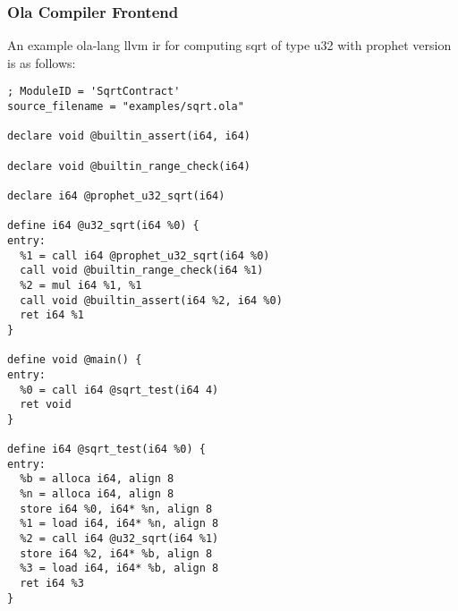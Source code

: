 \subsubsection{Ola Compiler Frontend}

An example ola-lang llvm ir for computing sqrt of type u32 with prophet version is as follows:
\begin{lstlisting}[language={}]
; ModuleID = 'SqrtContract'
source_filename = "examples/sqrt.ola"

declare void @builtin_assert(i64, i64)

declare void @builtin_range_check(i64)

declare i64 @prophet_u32_sqrt(i64)

define i64 @u32_sqrt(i64 %0) {
entry:
  %1 = call i64 @prophet_u32_sqrt(i64 %0)
  call void @builtin_range_check(i64 %1)
  %2 = mul i64 %1, %1
  call void @builtin_assert(i64 %2, i64 %0)
  ret i64 %1
}

define void @main() {
entry:
  %0 = call i64 @sqrt_test(i64 4)
  ret void
}

define i64 @sqrt_test(i64 %0) {
entry:
  %b = alloca i64, align 8
  %n = alloca i64, align 8
  store i64 %0, i64* %n, align 8
  %1 = load i64, i64* %n, align 8
  %2 = call i64 @u32_sqrt(i64 %1)
  store i64 %2, i64* %b, align 8
  %3 = load i64, i64* %b, align 8
  ret i64 %3
}
\end{lstlisting}


